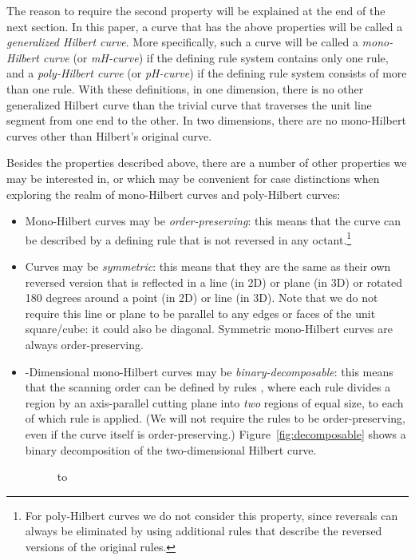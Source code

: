 \documentclass[11pt,a4paper]{article}
\begin{document}
The reason to require the second property will be explained at the end of the next section. In this paper, a curve that has the above properties will be called a \emph{generalized Hilbert curve}. More specifically, such a curve will be called a \emph{mono-Hilbert curve} (or \emph{mH-curve}) if the defining rule system contains only one rule, and a \emph{poly-Hilbert curve} (or \emph{pH-curve}) if the defining rule system consists of more than one rule. With these definitions, in one dimension, there is no other generalized Hilbert curve than the trivial curve that traverses the unit line segment from one end to the other. In two dimensions, there are no mono-Hilbert curves other than Hilbert's original curve.

Besides the properties described above, there are a number of other properties we may be interested in, or which may be convenient for case distinctions when exploring the realm of mono-Hilbert curves and poly-Hilbert curves:\begin{itemize}
\item Mono-Hilbert curves may be \emph{order-preserving}: this means that the curve can be described by a defining rule that is not reversed in any octant.\footnote{For poly-Hilbert curves we do not consider this property, since reversals can always be eliminated by using additional rules that describe the reversed versions of the original rules.}
\item Curves may be \emph{symmetric}: this means that they are the same as their own reversed version that is reflected in a line (in 2D) or plane (in 3D) or rotated 180 degrees around a point (in 2D) or line (in 3D). Note that we do not require this line or plane to be parallel to any edges or faces of the unit square/cube: it could also be diagonal. Symmetric mono-Hilbert curves are always order-preserving.
\item -Dimensional mono-Hilbert curves may be \emph{binary-decomposable}: this means that the scanning order can be defined by  rules , where each rule  divides a region by an axis-parallel cutting plane into \emph{two} regions of equal size, to each of which rule  is applied. (We will not require the rules  to be order-preserving, even if the curve itself is order-preserving.) Figure~\ref{fig:decomposable} shows a binary decomposition of the two-dimensional Hilbert curve.
\begin{figure}
\centering
\hbox to 
\end{figure}
\end{itemize}
\end{document}
